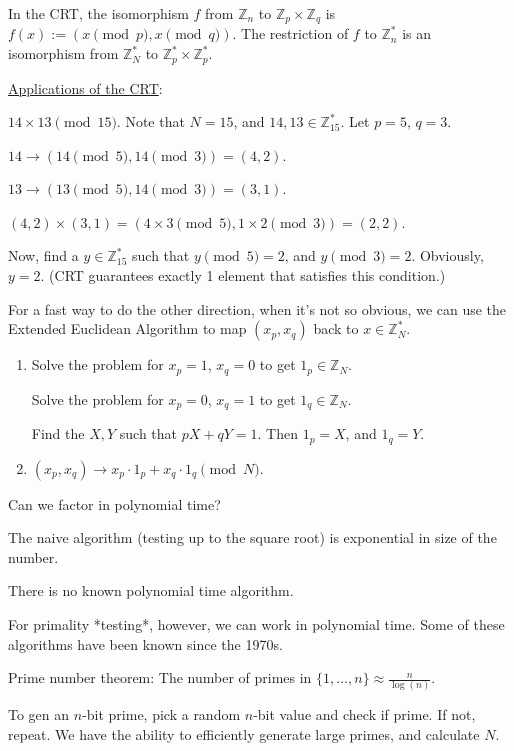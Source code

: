 \documentclass[12pt]{article}
\newcommand{\Z}{\mathbb{Z}}
\begin{document}
In the CRT, the isomorphism $f$ from $\Z_n$ to $\Z_p\times \Z_q$ is $f(x):=(x\pmod p, x\pmod q)$. The restriction of $f$ to $\Z_n^*$ is an isomorphism from $\Z_N^*$ to $\Z_p^*\times \Z_p^*$.

\underline{Applications of the CRT}:

$14\times13\pmod{15}$. Note that $N=15$, and $14,13\in\Z_{15}^*$. Let $p=5$, $q=3$.

$14\to(14\pmod 5, 14\pmod 3)=(4,2)$.

$13\to(13\pmod 5, 14\pmod3)=(3,1)$.

$(4,2)\times(3,1)=(4\times 3\pmod 5,1\times 2\pmod3)=(2,2)$.

Now, find a $y\in\Z_15^*$ such that $y\pmod5=2$, and $y\pmod3=2$. Obviously, $y=2$. (CRT guarantees exactly 1 element that satisfies this condition.)

For a fast way to do the other direction, when it's not so obvious, we can use the Extended Euclidean Algorithm to map $(x_p,x_q)$ back to $x\in\Z_N^*$.\begin{enumerate}

\item Solve the problem for $x_p=1$, $x_q=0$ to get $1_p\in\Z_N$.

Solve the problem for $x_p=0$, $x_q=1$ to get $1_q\in\Z_N$.

Find the $X,Y$ such that $pX+qY=1$. Then $1_p=X$, and $1_q=Y$.

\item $(x_p,x_q)\to x_p\cdot 1_p+x_q\cdot 1_q\pmod{N}$.

\end{enumerate}

Can we factor in polynomial time?

The naive algorithm (testing up to the square root) is exponential in size of the number.

There is no known polynomial time algorithm.

For primality *testing*, however, we can work in polynomial time. Some of these algorithms have been known since the 1970s.

Prime number theorem: The number of primes in $\{1,\dots,n\}\approx\frac{n}{\log(n)}$.

To gen an $n$-bit prime, pick a random $n$-bit value and check if prime. If not, repeat. We have the ability to efficiently generate large primes, and calculate $N$.
\end{document}
